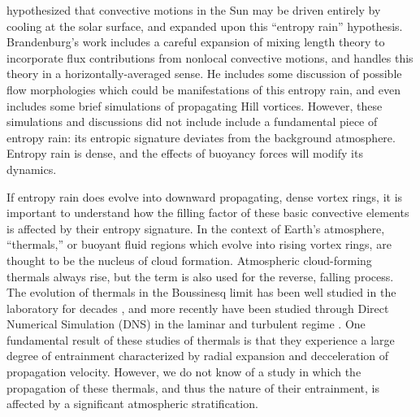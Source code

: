 \documentclass[twocolumn, amsmath, amsfonts, amssymb, trackchanges]{aastex62}
\begin{document}
\cite{spruit1997} hypothesized that convective motions in the Sun may be driven entirely by cooling at the solar surface, and \citet{brandenburg2016} expanded upon this ``entropy rain'' hypothesis. 
Brandenburg's work includes a careful expansion of mixing length theory to incorporate flux contributions from nonlocal convective motions, and handles this theory in a horizontally-averaged sense.
He includes some discussion of possible flow morphologies which could be manifestations of this entropy rain, and even includes some brief simulations of propagating Hill vortices. 
However, these simulations and discussions did not include include a fundamental piece of entropy rain: its entropic signature deviates from the background atmosphere.
Entropy rain is dense, and the effects of buoyancy forces will modify its dynamics.

If entropy rain does evolve into downward propagating, dense vortex rings, it is important to understand how the filling factor of these basic convective elements is affected by their entropy signature. 
In the context of Earth's atmosphere, ``thermals,'' or buoyant fluid regions which evolve into rising vortex rings, are thought to be the nucleus of cloud formation. 
Atmospheric cloud-forming thermals always rise, but the term is also used for the reverse, falling process.
The evolution of thermals in the Boussinesq limit has been well studied in the laboratory for decades \citep[see e.g.][]{morton&all1956, scorer1957}, and more recently have been studied through Direct Numerical Simulation (DNS) in the laminar and turbulent regime \citep{lecoanet&jeevanjee2018}. 
One fundamental result of these studies of thermals is that they experience a large degree of entrainment characterized by radial expansion and decceleration of propagation velocity.
However, we do not know of a study in which the propagation of these thermals, and thus the nature of their entrainment, is affected by a significant atmospheric stratification.
\end{document}
